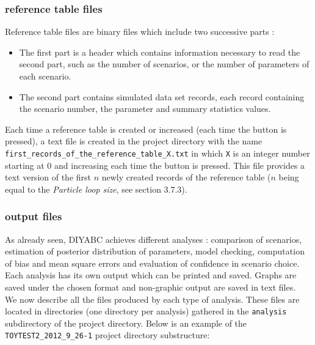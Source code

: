 \subsubsection{reference table files} 
Reference table files are binary files which include two successive parts :
\begin{itemize}
 \item The first part is a header which contains information necessary to read the second part, such as the number of scenarios, or the number of parameters of each scenario.
 \item The second part contains simulated data set records, each record containing the scenario number, the parameter and summary statistics values.
\end{itemize}
 
 Each time a reference table is created or increased (each time the  button is pressed), a text file is created in the project directory with the name \texttt{first\_records\_of\_the\_reference\_table\_X.txt} in which \texttt{X} is an integer number starting at 0 and increasing each time the  button is pressed. This file provides a text version of the first $n$ newly created records of the reference table ($n$ being equal to the \emph{Particle loop size}, see section 3.7.3).\\

\subsubsection{output files}
As already seen, DIYABC achieves different analyses : comparison of scenarios, estimation of posterior distribution of parameters, model checking,  computation of bias and mean square errors and evaluation of confidence in scenario choice. Each analysis has its own output which can be printed and saved. Graphs are saved under the chosen format and non-graphic output are saved in text files.\\

We now describe all the files produced by each type of analysis. These files are located in directories (one directory per analysis) gathered in the \texttt{analysis} subdirectory of the project directory. Below is an example of the \texttt{TOYTEST2\_2012\_9\_26-1} project directory substructure:\\

